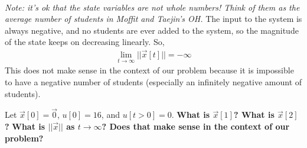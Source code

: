 \begin{enumerate}
{\begin{align*}
        \end{align*}
        \textit{Note: it's ok that the state variables are not whole numbers! Think of them as the average number of students in Moffit and Taejin's OH.}
        \newline
        The input to the system is always negative, and no students are ever added to the system, so the magnitude of the state keeps on decreasing linearly. So,
        \begin{align*}
            \lim_{t \to \infty} ||\vec{x}[t]|| = -\infty
        \end{align*}
        This does not make sense in the context of our problem because it is impossible to have a negative number of students (especially an infinitely negative amount of students).
    }

    \qitem Let $\vec{x}[0] = \vec{0}$, $u[0] = 16$, and $u[t>0] = 0$. \textbf{What is $\vec{x}[1]$? What is $\vec{x}[2]$?} \textbf{What is $||\vec{x}||$ as $t\rightarrow\infty$? Does that make sense in the context of our problem?}

    
\end{enumerate}